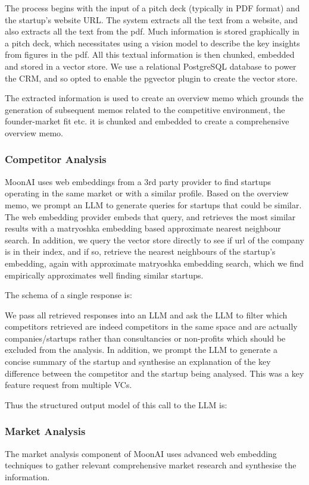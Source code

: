 \documentclass[a4paper, oneside]{discothesis}
\begin{document}
The process begins with the input of a pitch deck (typically in PDF format) and the startup's website URL. The system extracts all the text from a website, and also extracts all the text from the pdf. Much information is stored graphically in a pitch deck, which necessitates using a vision model to describe the key insights from figures in the pdf. All this textual information is then chunked, embedded and stored in a vector store. We use a relational PostgreSQL database to power the CRM, and so opted to enable the pgvector plugin to create the vector store.

The extracted information is used to create an overview memo which grounds the generation of subsequent memos related to the competitive environment, the founder-market fit etc. it is chunked and embedded to create a comprehensive overview memo. 

\subsubsection{Competitor Analysis}
MoonAI uses web embeddings from a 3rd party provider to find startups operating in the same market or with a similar profile. Based on the overview memo, we prompt an LLM to generate queries for startups that could be similar. The web embedding provider embeds that query, and retrieves the most similar results with a matryoshka embedding based approximate nearest neighbour search. In addition, we query the vector store directly to see if url of the company is in their index, and if so, retrieve the nearest neighbours of the startup's embedding, again with approximate matryoshka embedding search, which we find empirically approximates well finding similar startups. 

The schema of a single response is:

We pass all retrieved responses into an LLM and ask the LLM to filter which competitors retrieved are indeed competitors in the same space and are actually companies/startups rather than consultancies or non-profits which should be excluded from the analysis. In addition, we prompt the LLM to generate a concise summary of the startup and synthesise an explanation of the key difference between the competitor and the startup being analysed. This was a key feature request from multiple VCs.

Thus the structured output model of this call to the LLM is:

\subsubsection{Market Analysis}
The market analysis component of MoonAI uses advanced web embedding techniques to gather relevant comprehensive market research and synthesise the information. 
\end{document}
